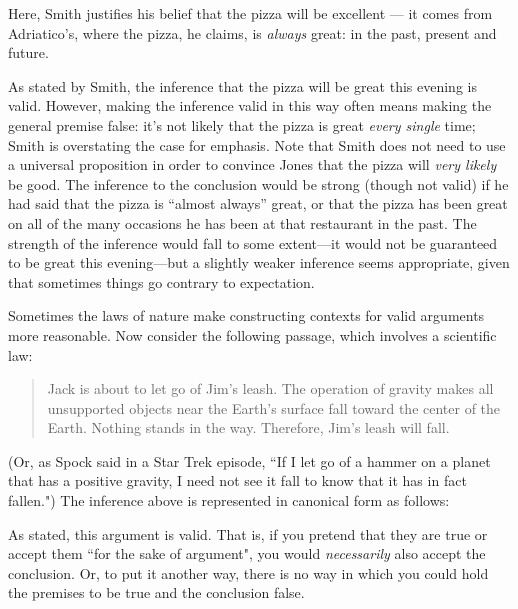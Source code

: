 Here, Smith justifies his belief that the pizza will be excellent --- it comes from Adriatico's, where the pizza, he claims, is \textit{always }great: in the past, present and future.

As stated by Smith, the inference that the pizza will be great this evening is valid. However, making the inference valid in this way often means making the general premise false: it's not likely that the pizza is great \textit{every single} time; Smith is overstating the case for emphasis. Note that Smith does not need to use a universal proposition in order to convince Jones that the pizza will \textit{very likely} be good. The inference to the conclusion would be strong (though not valid) if he had said that the pizza is ``almost always'' great, or that the pizza has been great on all of the many occasions he has been at that restaurant in the past. The strength of the inference would fall to some extent---it would not be guaranteed to be great this evening---but a slightly weaker inference seems appropriate, given that sometimes things go contrary to expectation.

Sometimes the laws of nature make constructing contexts for valid arguments more reasonable. Now consider the following passage, which involves a scientific law:

\begin{quotation}Jack is about to let go of Jim's leash. The operation of gravity makes all unsupported objects near the Earth's surface fall toward the center of the Earth. Nothing stands in the way. Therefore, Jim's leash will fall. \end{quotation}

(Or, as Spock said in a Star Trek episode, ``If I let go of a hammer on a planet that has a positive gravity, I need not see it fall to know that it has in fact fallen.") The inference above is represented in canonical form as follows:

\begin{kormanize}
\end{kormanize}

As stated, this argument is valid. That is, if you pretend that they are true or accept them ``for the sake of argument", you would \textit{necessarily} also accept the conclusion. Or, to put it another way, there is no way in which you could hold the premises to be true and the conclusion false.

